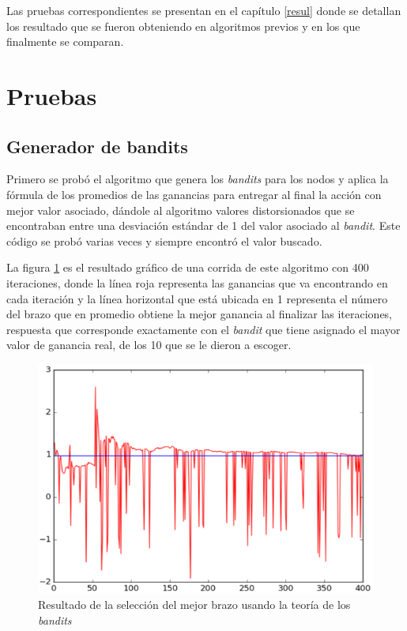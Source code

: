 Las pruebas correspondientes se presentan en el capítulo \ref{resul} donde se detallan los resultado que se fueron obteniendo en algoritmos previos y en los que finalmente se comparan.

\section{Pruebas}

\subsection{Generador de bandits}

Primero se probó el algoritmo que genera los \textit{bandits} para los nodos y aplica la fórmula de los promedios de las ganancias para entregar al final la acción con mejor valor asociado, dándole al algoritmo valores distorsionados que se encontraban entre una desviación estándar de 1 del valor asociado al \textit{bandit}. Este código se probó varias veces y siempre encontró el valor buscado. 

La figura \ref{AlgBandit} es el resultado gráfico de una corrida de este algoritmo con 400 iteraciones, donde la línea roja representa las ganancias que va encontrando en cada iteración y la línea horizontal que está ubicada en 1 representa el número del brazo que en promedio obtiene la mejor ganancia al finalizar las iteraciones, respuesta que corresponde exactamente con el \textit{bandit} que tiene asignado el mayor valor de ganancia real, de los 10 que se le dieron a escoger.

\begin{figure} [H]
    \label{Resul2}
	\centering
	\includegraphics[scale=0.6]{AlgBandit}
	\caption{Resultado de la selección del mejor brazo usando la teoría de los \textit{bandits}}
	\label{AlgBandit}
\end{figure}

